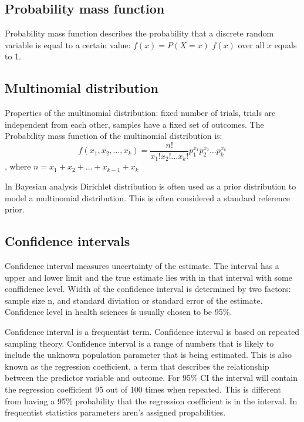 \subsection*{Probability mass function} \label{PropabilityMassFunction}
Probability mass function describes the probability that a discrete random variable is equal to a certain value: $f(x) = P(X = x)$ $f(x)$ over all $x$ equals to 1.\cite{pmf}

\subsection*{Multinomial distribution}\label{MultinomialDistribution}
Properties of the multinomial distribution: fixed number of trials, trials are independent from each other, samples have a fixed set of outcomes. The Probability mass function of the multinomial distribution is:
\begin{equation}
f(x_1, x_2, ..., x_k) = \frac{n!}{x_1!x_2!...x_k!}p_1^{x_1}p_2^{x_2}...p_k^{x_k}
\end{equation}, where $n = x_1 + x_2 + ... + x_{k-1} + x_k$\cite{multinomialDistribution}\cite{SINHARAY201098}

In Bayesian analysis Dirichlet distribution is often used as a prior distribution to model a multinomial distribution. \cite{SINHARAY201098} This is often considered a standard reference prior.\cite{Pirikahu2016BayesianMO}

\subsection*{Confidence intervals}\label{ConfidenceIntervals}
Confidence interval measures uncertainty of the estimate. The interval has a upper and lower limit and the true estimate lies with in that interval with some conffidence level. Width of the confidence interval is determined by two factors: sample size n, and standard diviation or standard error of the estimate. Confidence level in health sciences ís usually chosen to be 95\%.\cite{Hespanhol2019UnderstandingAI}

Confidence interval is a frequentist term. Confidence interval is based on repeated sampling theory.\cite{Schoot2014BayesianA} Confidence interval is a range of numbers that is likely to include the unknown population parameter that is being estimated.\cite{Illowsky2013IntroductorySO} This is also known as the regression coefficient, a term that describes the relationship between the predictor variable and outcome.\cite{RegressionCoefficients} For 95\% CI the interval will contain the regression coefficient 95 out of 100 times when repeated.\cite{Schoot2014BayesianA} This is different from having a 95\% probability that the regression coefficient is in the interval. In frequentist statistics parameters aren's assigned propabilities. \cite{FornaconWood2022UnderstandingTD}

